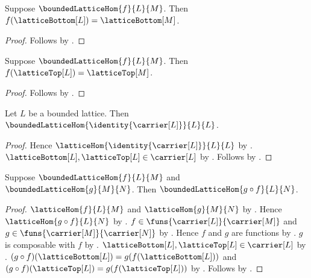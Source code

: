 \begin{proposition}\label{bounded_lattice_hom_bottom}
    Suppose $\boundedLatticeHom{f}{L}{M}$.
    Then $f(\latticeBottom[L])=\latticeBottom[M]$.
\end{proposition}
\begin{proof}
    Follows by .
\end{proof}

\begin{proposition}\label{bounded_lattice_hom_top}
    Suppose $\boundedLatticeHom{f}{L}{M}$.
    Then $f(\latticeTop[L])=\latticeTop[M]$.
\end{proposition}
\begin{proof}
    Follows by .
\end{proof}

\begin{proposition}\label{identity_bounded_lattice_hom}
    Let $L$ be a bounded lattice.
    Then $\boundedLatticeHom{\identity{\carrier[L]}}{L}{L}$.
\end{proposition}
\begin{proof}
    Hence $\latticeHom{\identity{\carrier[L]}}{L}{L}$ by
        .
    $\latticeBottom[L],\latticeTop[L]\in\carrier[L]$ by
        .
    Follows by .
\end{proof}

\begin{theorem}\label{bounded_lattice_hom_composition}
    Suppose $\boundedLatticeHom{f}{L}{M}$ and
        $\boundedLatticeHom{g}{M}{N}$.
    Then $\boundedLatticeHom{g\circ f}{L}{N}$.
\end{theorem}
\begin{proof}
    $\latticeHom{f}{L}{M}$ and $\latticeHom{g}{M}{N}$ by
        .
    Hence $\latticeHom{g\circ f}{L}{N}$ by
        .
    $f\in\funs{\carrier[L]}{\carrier[M]}$ and
        $g\in\funs{\carrier[M]}{\carrier[N]}$ by
        .
    Hence $f$ and $g$ are functions by .
    $g$ is composable with $f$ by .
    $\latticeBottom[L],\latticeTop[L]\in\carrier[L]$ by
        .
    $(g\circ f)(\latticeBottom[L])
        =g(f(\latticeBottom[L]))$ and
        $(g\circ f)(\latticeTop[L])
        =g(f(\latticeTop[L]))$ by .
    Follows by
        .
\end{proof}

